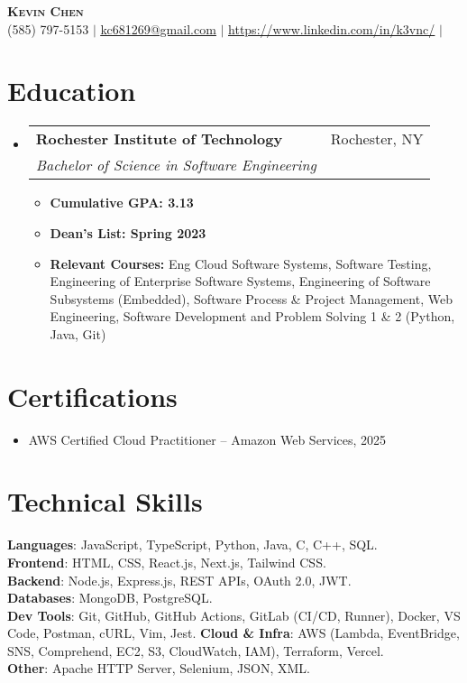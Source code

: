 \documentclass[letterpaper,11pt]{article}
\makeatletter
\newcommand{\resumeItem}[1]{
  \item\small{
    {#1 \vspace{-2pt}}
  }
}
\newcommand{\resumeSubheading}[4]{
  \vspace{-2pt}\item
    \begin{tabular*}{0.97\textwidth}[t]{l@{\extracolsep{\fill}}r}
      \textbf{#1} & #2 \\
      \textit{\small#3} & \textit{\small #4} \\
    \end{tabular*}\vspace{-7pt}
}
\newcommand{\resumeSubHeadingListStart}{\begin{itemize}[leftmargin=0.15in, label={}]}
\newcommand{\resumeSubHeadingListEnd}{\end{itemize}}
\newcommand{\resumeItemListStart}{\begin{itemize}}
\newcommand{\resumeItemListEnd}{\end{itemize}\vspace{-5pt}}
\makeatother
\begin{document}
\begin{center}
    \textbf{\Huge \scshape Kevin Chen} \\ \vspace{1pt}
    \small (585) 797-5153 $|$ \href{mailto:x@x.com}{\underline{kc681269@gmail.com}} $|$ 
    \href{https://linkedin.com/in/...}{\underline{https://www.linkedin.com/in/k3vnc/}} $|$
\end{center}

\section{Education}
  \resumeSubHeadingListStart
    \resumeSubheading
      {Rochester Institute of Technology}{Rochester, NY}
      {Bachelor of Science in Software Engineering}{}
      \resumeItemListStart
        \resumeItem{\textbf{Cumulative GPA: 3.13}}
        \resumeItem{\textbf{Dean's List: Spring 2023}}
        \resumeItem{\textbf{Relevant Courses:} Eng Cloud Software Systems, Software Testing, Engineering of Enterprise Software Systems, Engineering of Software Subsystems (Embedded), Software Process \& Project Management, Web Engineering, Software Development and Problem Solving 1 \& 2 (Python, Java, Git)}
      \resumeItemListEnd
  \resumeSubHeadingListEnd

\section{Certifications}
  \resumeSubHeadingListStart
    \resumeItem{AWS Certified Cloud Practitioner -- Amazon Web Services, 2025}
  \resumeSubHeadingListEnd

\section{Technical Skills}
\begin{itemize}[leftmargin=0.15in, label={}]
\small{\item{
\textbf{Languages}{: JavaScript, TypeScript, Python, Java, C, C++, SQL.} \\
\textbf{Frontend}{: HTML, CSS, React.js, Next.js, Tailwind CSS.} \\
\textbf{Backend}{: Node.js, Express.js, REST APIs, OAuth 2.0, JWT.} \\
\textbf{Databases}{: MongoDB, PostgreSQL.} \\
\textbf{Dev Tools}{: Git, GitHub, GitHub Actions, GitLab (CI/CD, Runner), Docker, VS Code, Postman, cURL, Vim, Jest.}
\textbf{Cloud \& Infra}{: AWS (Lambda, EventBridge, SNS, Comprehend, EC2, S3, CloudWatch, IAM), Terraform, Vercel.} \\
\textbf{Other}{: Apache HTTP Server, Selenium, JSON, XML.}}}
\end{itemize}
\end{document}
